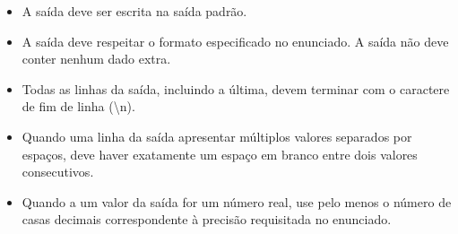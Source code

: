 \begin{itemize}

\item A saída deve ser escrita na saída padrão.

\item A saída deve respeitar o formato especificado no enunciado. A saída não deve
conter nenhum dado extra.

\item Todas as linhas da saída, incluindo a última, devem terminar com o caractere de fim
de linha (\textbackslash n).

\item Quando uma linha da saída apresentar múltiplos valores separados por espaços, deve haver
exatamente um espaço em branco entre dois valores consecutivos.

\item Quando a um valor da saída for um número real, use pelo menos o número de casas decimais correspondente
à precisão requisitada no enunciado.

\end{itemize}
